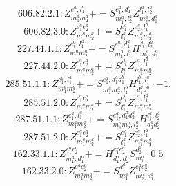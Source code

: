 \documentclass[letterpaper,10pt,fleqn,leqno,onecolumn]{article}
\begin{document}
\begin{equation} \;\;\;\;\;\;  606.82.2.1: Z^{e_{1}^{a},l_{1}^{a}}_{m_{1}^{a}m_{2}^{a}}+=S^{e_{1}^{a},d_{1}^{a}}_{m_{1}^{a},l_{2}^{a}}Z^{l_{1}^{a},l_{2}^{a}}_{m_{2}^{a},d_{1}^{a}} \end{equation}
\begin{equation} \;\;\;\;\;\;  606.82.3.0: Z^{e_{1}^{a}e_{2}^{a}}_{m_{1}^{a}m_{2}^{a}}+=S^{e_{1}^{a}}_{l_{1}^{a}}Z^{e_{2}^{a},l_{1}^{a}}_{m_{1}^{a}m_{2}^{a}} \end{equation}
\begin{equation} \;\;\;\;\;\;  227.44.1.1: Z^{e_{1}^{a},l_{1}^{a}}_{m_{1}^{a}m_{2}^{a}}+=S^{e_{1}^{a},d_{1}^{a}}_{m_{1}^{a},l_{2}^{a}}H^{l_{1}^{a},l_{2}^{a}}_{m_{2}^{a},d_{1}^{a}} \end{equation}
\begin{equation} \;\;\;\;\;\;  227.44.2.0: Z^{e_{1}^{a}e_{2}^{a}}_{m_{1}^{a}m_{2}^{a}}+=S^{e_{1}^{a}}_{l_{1}^{a}}Z^{e_{2}^{a},l_{1}^{a}}_{m_{1}^{a}m_{2}^{a}} \end{equation}
\begin{equation} \;\;\;\;\;\;  285.51.1.1: Z^{e_{1}^{a},l_{1}^{a}}_{m_{1}^{a}m_{2}^{a}}+=S^{e_{1}^{a},d_{1}^{a}d_{1}^{b}}_{m_{1}^{a}m_{2}^{a},l_{1}^{b}}H^{l_{1}^{b},l_{1}^{a}}_{d_{1}^{a}d_{1}^{b}}\cdot -1. \end{equation}
\begin{equation} \;\;\;\;\;\;  285.51.2.0: Z^{e_{1}^{a}e_{2}^{a}}_{m_{1}^{a}m_{2}^{a}}+=S^{e_{1}^{a}}_{l_{1}^{a}}Z^{e_{2}^{a},l_{1}^{a}}_{m_{1}^{a}m_{2}^{a}} \end{equation}
\begin{equation} \;\;\;\;\;\;  287.51.1.1: Z^{e_{1}^{a},l_{1}^{a}}_{m_{1}^{a}m_{2}^{a}}+=S^{e_{1}^{a},d_{1}^{a}d_{2}^{a}}_{m_{1}^{a}m_{2}^{a},l_{2}^{a}}H^{l_{1}^{a},l_{2}^{a}}_{d_{1}^{a}d_{2}^{a}} \end{equation}
\begin{equation} \;\;\;\;\;\;  287.51.2.0: Z^{e_{1}^{a}e_{2}^{a}}_{m_{1}^{a}m_{2}^{a}}+=S^{e_{1}^{a}}_{l_{1}^{a}}Z^{e_{2}^{a},l_{1}^{a}}_{m_{1}^{a}m_{2}^{a}} \end{equation}
\begin{equation} \;\;\;\;\;\;  162.33.1.1: Z^{e_{1}^{a}e_{2}^{a}}_{m_{1}^{a},d_{1}^{a}}+=H^{e_{1}^{a}e_{2}^{a}}_{d_{1}^{a},d_{2}^{a}}S^{d_{2}^{a}}_{m_{1}^{a}}\cdot 0.5 \end{equation}
\begin{equation} \;\;\;\;\;\;  162.33.2.0: Z^{e_{1}^{a}e_{2}^{a}}_{m_{1}^{a}m_{2}^{a}}+=S^{d_{1}^{a}}_{m_{1}^{a}}Z^{e_{1}^{a}e_{2}^{a}}_{m_{2}^{a},d_{1}^{a}} \end{equation}
\end{document}
